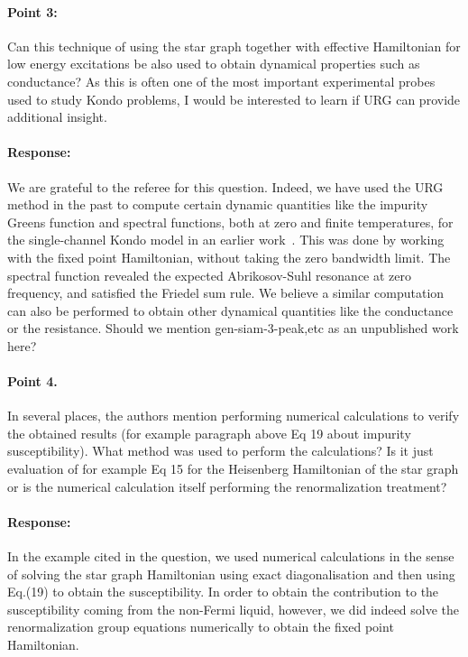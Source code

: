 \documentclass[11pt]{article}
\begin{document}
\paragraph{Point 3:}
Can this technique of using the star graph together with effective Hamiltonian for low energy excitations be also used to obtain dynamical properties such as conductance? As this is often one of the most important experimental probes used to study Kondo problems, I would be interested to learn if URG can provide additional insight.

{\color{blue}\paragraph{Response:} We are grateful to the referee for this question. Indeed, we have used the URG method in the past to compute certain dynamic quantities like the impurity Greens function and spectral functions, both at zero and finite temperatures, for the single-channel Kondo model in an earlier work~\cite{kondo_urg}. This was done by working with the fixed point Hamiltonian, without taking the zero bandwidth limit. The spectral function revealed the expected Abrikosov-Suhl resonance at zero frequency, and satisfied the Friedel sum rule. We believe a similar  computation can also be performed to obtain other dynamical quantities like the conductance or the resistance. {\color{red}Should we mention gen-siam-3-peak,etc as an unpublished work here?}}

\paragraph{Point 4.}
In several places, the authors mention performing numerical calculations to verify the obtained results (for example paragraph above Eq 19 about impurity susceptibility). What method was used to perform the calculations? Is it just evaluation of for example Eq 15 for the Heisenberg Hamiltonian of the star graph or is the numerical calculation itself performing the renormalization treatment?

{\color{blue}\paragraph{Response:} In the example cited in the question, we used numerical calculations in the sense of solving the star graph Hamiltonian using exact diagonalisation and then using Eq.(19) to obtain the susceptibility. In order to obtain the contribution to the susceptibility coming from the non-Fermi liquid, however, we did indeed solve the renormalization group equations numerically to obtain the fixed point Hamiltonian.}
\end{document}
